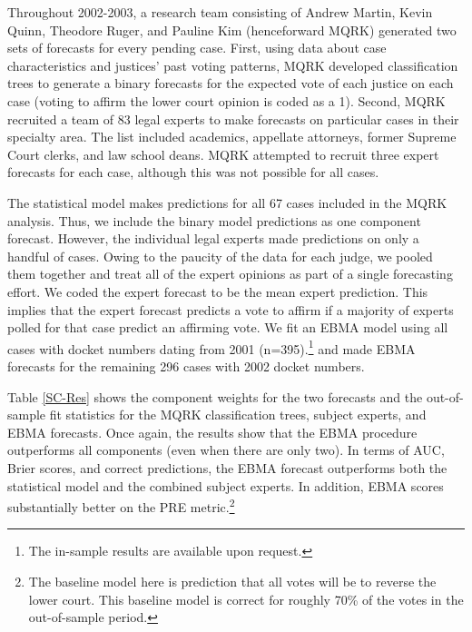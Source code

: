 \documentclass[12pt,fullpage]{article}
\newcommand{\note}[1]{\footnote{\doublespacing#1 \vspace{4 mm}}}
\begin{document}
Throughout 2002-2003, a research team consisting of Andrew
Martin, Kevin Quinn, Theodore Ruger, and Pauline Kim (henceforward
MQRK) generated two sets of forecasts for every pending case.  First,
using data about case characteristics and justices' past voting
patterns, MQRK developed classification trees to generate a binary
forecasts for the expected vote of each justice on each case (voting
to affirm the lower court opinion is coded as a 1).  Second, MQRK
recruited a team of 83 legal experts to make forecasts on particular
cases in their specialty area.  The list included academics, appellate
attorneys, former Supreme Court clerks, and law school deans.  MQRK
attempted to recruit three expert forecasts for each case, although
this was not possible for all cases.

The statistical model makes predictions for all 67 cases included in
the MQRK analysis.  Thus, we include the binary model predictions as
one component forecast. However, the individual legal experts made
predictions on only a handful of cases. Owing to the paucity of the
data for each judge, we pooled them together and treat all of the
expert opinions as part of a single forecasting effort.  We coded the
expert forecast to be the mean expert prediction. This implies that
the expert forecast predicts a vote to affirm if a majority of experts
polled for that case predict an affirming vote.  We fit an EBMA model
using all cases with docket numbers dating from 2001 (n=395).\note{The
  in-sample results are available upon request.} and made EBMA forecasts for
the remaining 296 cases with 2002 docket numbers.


Table \ref{SC-Res} shows the component weights for the two forecasts
and the out-of-sample fit statistics for the MQRK classification
trees, subject experts, and EBMA forecasts. Once again, the results
show that the EBMA procedure outperforms all components (even when
there are only two).  In terms of AUC, Brier scores, and correct
predictions, the EBMA forecast outperforms both the statistical model
and the combined subject experts.  In addition, EBMA scores
substantially better on the PRE metric.\note{The baseline model here
  is prediction that all votes will be to reverse the lower court.
  This baseline model is correct for roughly 70\% of the votes in the
  out-of-sample period.}
\end{document}
